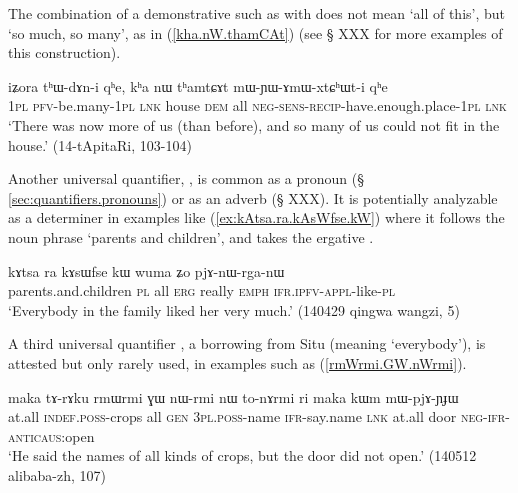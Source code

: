 The combination of a demonstrative such as  with   does not mean `all of this', but `so much, so many', as in (\ref{kha.nW.thamCAt}) (see § XXX for more examples of this construction).

\begin{exe}
\ex \label{kha.nW.thamCAt}
 \gll iʑora tʰɯ-dɤn-i qʰe, kʰa nɯ tʰamtɕɤt mɯ-ɲɯ-ɤmɯ-xtɕʰɯt-i qʰe \\ 
 \textsc{1pl} \textsc{pfv}-be.many-\textsc{1pl} \textsc{lnk} house \textsc{dem} all \textsc{neg}-\textsc{sens}-\textsc{recip}-have.enough.place-\textsc{1pl} \textsc{lnk} \\
 \glt `There was now more of us (than before), and so many of us could not fit in the house.' (14-tApitaRi, 103-104)
 \end{exe}
 
 Another universal quantifier,  , is common as a pronoun (§ \ref{sec:quantifiers.pronouns}) or as an adverb (§ XXX). It is potentially analyzable as a determiner in examples like  (\ref{ex:kAtsa.ra.kAsWfse.kW}) where it follows the noun phrase  `parents and children', and takes the ergative .
 
 \begin{exe}
\ex \label{ex:kAtsa.ra.kAsWfse.kW}
\gll  kɤtsa ra kɤsɯfse kɯ wuma ʑo pjɤ-nɯ-rga-nɯ  \\
parents.and.children \textsc{pl} all \textsc{erg} really \textsc{emph} \textsc{ifr}.\textsc{ipfv}-\textsc{appl}-like-\textsc{pl} \\
\glt `Everybody in the family liked her very much.' (140429 qingwa wangzi, 5)
  \end{exe}
  
A third universal quantifier , a borrowing from Situ (meaning `everybody'), is attested but only rarely used, in examples such as (\ref{rmWrmi.GW.nWrmi}).
  
\begin{exe}
\ex \label{rmWrmi.GW.nWrmi}
\gll  maka tɤ-rɤku rmɯrmi ɣɯ nɯ-rmi nɯ to-nɤrmi ri maka kɯm mɯ-pjɤ-ɲɟɯ   \\
at.all \textsc{indef}.\textsc{poss}-crops all \textsc{gen} \textsc{3pl}.\textsc{poss}-name \textsc{ifr}-say.name \textsc{lnk} at.all door \textsc{neg}-\textsc{ifr}-\textsc{anticaus}:open \\
\glt `He said the names of all kinds of crops, but the door did not open.' (140512 alibaba-zh, 107)
\end{exe}  

